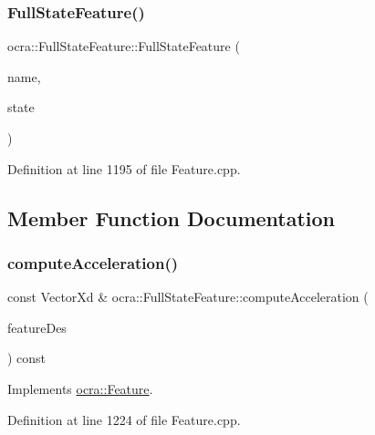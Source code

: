 \subsubsection{\texorpdfstring{Full\+State\+Feature()}{FullStateFeature()}}
{\footnotesize\ttfamily ocra\+::\+Full\+State\+Feature\+::\+Full\+State\+Feature (\begin{DoxyParamCaption}\item[{const std\+::string \&}]{name,  }\item[{Full\+State\+::\+Ptr}]{state }\end{DoxyParamCaption})}



Definition at line 1195 of file Feature.\+cpp.



\subsection{Member Function Documentation}
\hypertarget{classocra_1_1FullStateFeature_a1ca39e66ea07182b46ba7e60477efb17}{}\label{classocra_1_1FullStateFeature_a1ca39e66ea07182b46ba7e60477efb17} 
\subsubsection{\texorpdfstring{compute\+Acceleration()}{computeAcceleration()}\hspace{0.1cm}{\footnotesize\ttfamily [1/2]}}
{\footnotesize\ttfamily const Vector\+Xd \& ocra\+::\+Full\+State\+Feature\+::compute\+Acceleration (\begin{DoxyParamCaption}\item[{const \hyperlink{classocra_1_1Feature}{Feature} \&}]{feature\+Des }\end{DoxyParamCaption}) const\hspace{0.3cm}{\ttfamily [virtual]}}



Implements \hyperlink{classocra_1_1Feature_a4a5973d27459d2dececec8dc73038df8}{ocra\+::\+Feature}.



Definition at line 1224 of file Feature.\+cpp.

\hypertarget{classocra_1_1FullStateFeature_a7e668c7fa50e2ee6947c2f97dcd18e4e}{}\label{classocra_1_1FullStateFeature_a7e668c7fa50e2ee6947c2f97dcd18e4e} 
